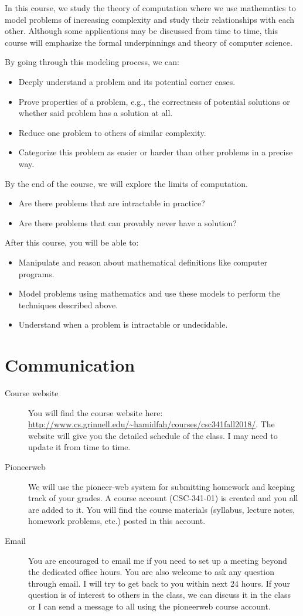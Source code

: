 \documentclass[twoside]{article}
\begin{document}
\par In this course, we study the theory of computation where we use mathematics to model problems of increasing complexity and study their relationships with each other. Although some applications may be discussed from time to time, this course will emphasize the formal underpinnings and theory of computer science.
\par By going through this modeling process, we can:
\begin{itemize}
\item Deeply understand a problem and its potential corner cases.
\item Prove properties of a problem, e.g., the correctness of potential solutions or whether said problem has a solution at all.
\item Reduce one problem to others of similar complexity.
\item Categorize this problem as easier or harder than other problems in a precise way.
\end{itemize}
By the end of the course, we will explore the limits of computation.
\begin{itemize}
\item Are there problems that are intractable in practice?
\item Are there problems that can provably never have a solution?
\end{itemize}
After this course, you will be able to:
\begin{itemize}
\item Manipulate and reason about mathematical definitions like computer programs.
\item Model problems using mathematics and use these models to perform the techniques described above.
\item Understand when a problem is intractable or undecidable.
\end{itemize}
\section{Communication}
\begin{description}
\item [Course website] You will find the course website here: \url{http://www.cs.grinnell.edu/~hamidfah/courses/csc341fall2018/}. The website will give you the detailed schedule of the class. I may need to update it from time to time. 
\item [Pioneerweb] We will use the pioneer-web system for submitting homework and keeping track of your grades. A course account (CSC-341-01) is created and you all are added to it. You will find the course materials (syllabus, lecture notes, homework problems, etc.) posted in this account. 
\item [Email] You are encouraged to email me if you need to set up a meeting beyond the dedicated office hours. You are also welcome to ask any question through email. I will try to get back to you within next 24 hours. If your question is of interest to others in the class, we can discuss it in the class or I can send a message to all using the pioneerweb course account.
\end{description}
\end{document}
